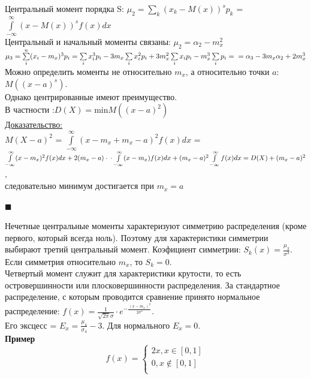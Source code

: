 \documentclass[russian, 12pt, fleqn]{article}
\begin{document}
Центральный момент порядка S:  $\mu_2 = \sum\limits_{k}^{}(x_k-M(x))^sp_k$  = $\int\limits_{-\infty}^{\infty}(x- M(x))^sf(x)dx$\\
Центральный и начальный моменты связаны: $\mu_2 = \alpha_2 - m_x^2$\\
$\mu_3 = \sum\limits_{i}^{n}(x_i-m_x)^3p_i =\sum\limits_{i}^{}x_i^3p_i - 3m_x\sum\limits_{i}^{ }x_i^2p_i + 3m_x^2\sum\limits_{i}^{ }x_ip_i - m_x^3\sum\limits_{i}^{ }p_i = \\
= \alpha_3 - 3 m_x \alpha_2  + 2m_x^3$\\
Можно определить моменты не относительно $m_x$, а относительно точки $a$:\\ $M((x-a)^s)$.\\
Однако центрированные имеют преимущество.
\\В  частности :$D(X) = $min$ M((x-a)^2)$\\
\underline{Доказательство:}\\
$M(X-a)^2$ = $\int\limits_{-\infty}^{\infty}(x-m_x+m_x-a)^2f(x)dx$ = $\int\limits_{-\infty}^{\infty}(x-m_x)^2f(x)dx + 2(m_x-a)\cdot \\
 \cdot \int\limits_{-\infty}^{\infty}(x-m_x)f(x)dx + (m_x - a)^2 \int\limits_{-\infty}^{\infty} f(x)dx = D(X) + (m_x-a)^2$,\\ следовательно минимум достигается при $m_x=a$
\begin{flushright}\(\blacksquare\)\end{flushright}
Нечетные центральные моменты характеризуют симметрию распределения (кроме первого, который всегда ноль). Поэтому для характеристики симметрии выбирают третий центральный  момент.
Коэфициент симметрии: $S_k(x) = \frac{\mu_3}{\sigma^3}$.\\
Если симметрия относительно $m_x$, то $S_k = 0$.\\
Четвертый момент служит для характеристики крутости, то есть\\
 островершинности или плосковершинности распределения. За стандартное распределение,  с которым проводится сравнение принято нормальное распределение: $f(x) = \frac{1}{\sqrt{2\pi}\sigma}\cdot e^{-\frac{(x-m_x)^2}{2\sigma^2}}$. \\
Его эксцесс = $E_x = \frac{\mu_4}{\sigma_4} - 3$. Для нормального $E_x = 0$.\\
\textbf{Пример\ }\\
\begin{equation*} 
f(x)=
 \begin{cases}
   2x,  x \in [0, 1]\\
   0 , x \notin [0, 1]\\
 \end{cases}
\end{equation*}\\
\end{document}
